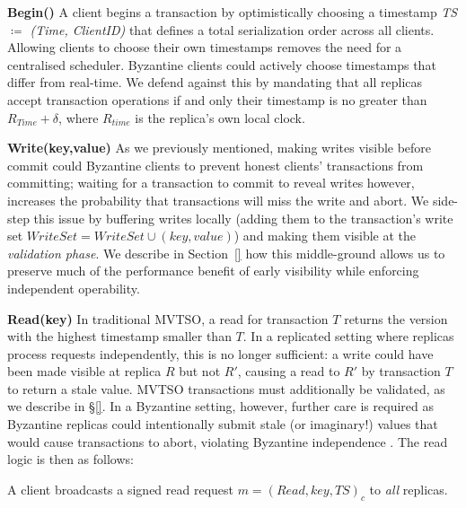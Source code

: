 \par \textbf{Begin()} A client begins a transaction by optimistically choosing a timestamp \textit{TS $\coloneqq$ (Time, ClientID)} that defines a total serialization order across all clients. Allowing clients to choose their own timestamps removes the need for a centralised scheduler. Byzantine clients could actively choose timestamps that differ from real-time. We defend against this by mandating that all replicas accept transaction operations if and only their timestamp is no greater than
$R_{Time} + \delta$, where $R_{time}$ is the replica's own local clock.

\par \textbf{Write(key,value)} As we previously mentioned, making writes visible before commit could Byzantine clients to prevent honest clients' transactions from committing; waiting for a transaction to commit to reveal writes however, increases the probability that transactions will miss the write and abort. We side-step this issue by buffering writes locally (adding them to the transaction's write set $WriteSet = WriteSet \cup(key,value)$) and making them visible at the \textit{validation phase}. We describe in Section~\ref{}
how this middle-ground allows us to preserve
much of the performance benefit of early visibility while enforcing independent operability.

\par \textbf{Read(key)} In traditional MVTSO, a read for transaction $T$ returns the version with the highest timestamp smaller than $T$. In a replicated setting where replicas process requests independently, this is no longer sufficient: a write could have been made visible at replica $R$ but not $R'$, causing a read to $R'$ by transaction $T$ to return a stale value. MVTSO transactions must additionally be validated, as we describe in \S\ref{}. In a Byzantine
setting, however, further care is required as Byzantine replicas could intentionally submit stale (or imaginary!) values that would cause transactions to abort, violating Byzantine independence . The read logic is then as follows:


A client broadcasts a signed read request  $m = (Read, key, TS)_c$ to \textit{all} replicas.


